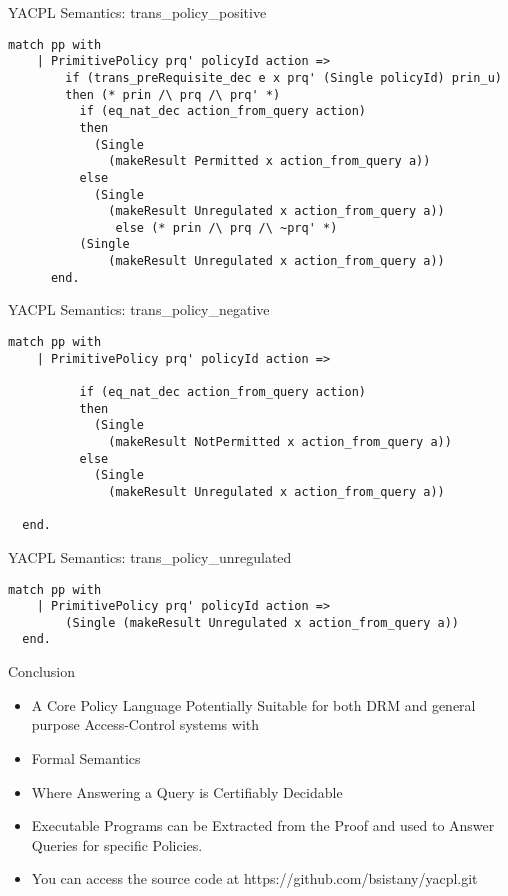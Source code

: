 \documentclass{beamer}
\begin{document}
\begin{frame}[fragile]{YACPL Semantics: trans\_policy\_positive}
\lstset{language=Coq}
\begin{lstlisting}
match pp with
    | PrimitivePolicy prq' policyId action =>
        if (trans_preRequisite_dec e x prq' (Single policyId) prin_u)
        then (* prin /\ prq /\ prq' *)
          if (eq_nat_dec action_from_query action)
          then
            (Single 
              (makeResult Permitted x action_from_query a))
          else
            (Single 
              (makeResult Unregulated x action_from_query a))
               else (* prin /\ prq /\ ~prq' *)
          (Single 
              (makeResult Unregulated x action_from_query a))
      end.
\end{lstlisting}
\end{frame}
\begin{frame}[fragile]{YACPL Semantics: trans\_policy\_negative}
\lstset{language=Coq}
\begin{lstlisting}
match pp with
    | PrimitivePolicy prq' policyId action =>
 
          if (eq_nat_dec action_from_query action)
          then
            (Single 
              (makeResult NotPermitted x action_from_query a))
          else
            (Single 
              (makeResult Unregulated x action_from_query a))

  end.

\end{lstlisting}
\end{frame}
\begin{frame}[fragile]{YACPL Semantics: trans\_policy\_unregulated}
\lstset{language=Coq}
\begin{lstlisting}
match pp with
    | PrimitivePolicy prq' policyId action =>
        (Single (makeResult Unregulated x action_from_query a))
  end.
\end{lstlisting}
\end{frame}
\begin{frame}[fragile]{Conclusion}
\Large
\begin{itemize}
\item A Core Policy Language Potentially Suitable for both DRM and general purpose Access-Control systems with 
\item Formal Semantics 
\item Where Answering a Query is Certifiably Decidable
\item Executable Programs can be Extracted from the Proof and used to Answer Queries for specific Policies.
\item You can access the source code at https://github.com/bsistany/yacpl.git
\end{itemize}
\end{frame}
\end{document}

